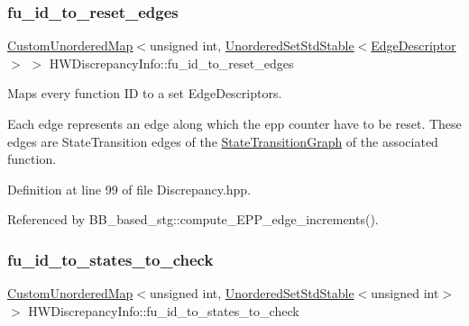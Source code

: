 \mbox{\label{structHWDiscrepancyInfo_a0e2c562ae790d5f14cf7ce2a9a8bfd88}} 
\subsubsection{\texorpdfstring{fu\+\_\+id\+\_\+to\+\_\+reset\+\_\+edges}{fu\_id\_to\_reset\_edges}}
{\footnotesize\ttfamily \hyperlink{custom__map_8hpp_ad1ed68f2ff093683ab1a33522b144adc}{Custom\+Unordered\+Map}$<$unsigned int, \hyperlink{custom__set_8hpp_a1f63d303cef2790dc0a0ff7feae38f83}{Unordered\+Set\+Std\+Stable}$<$\hyperlink{graph_8hpp_a9eb9afea34e09f484b21f2efd263dd48}{Edge\+Descriptor}$>$ $>$ H\+W\+Discrepancy\+Info\+::fu\+\_\+id\+\_\+to\+\_\+reset\+\_\+edges}



Maps every function ID to a set Edge\+Descriptors. 

Each edge represents an edge along which the epp counter have to be reset. These edges are State\+Transition edges of the \hyperlink{structStateTransitionGraph}{State\+Transition\+Graph} of the associated function. 

Definition at line 99 of file Discrepancy.\+hpp.



Referenced by B\+B\+\_\+based\+\_\+stg\+::compute\+\_\+\+E\+P\+P\+\_\+edge\+\_\+increments().

\mbox{\label{structHWDiscrepancyInfo_a094b1af848ebfd6303824a42c9a32667}} 
\subsubsection{\texorpdfstring{fu\+\_\+id\+\_\+to\+\_\+states\+\_\+to\+\_\+check}{fu\_id\_to\_states\_to\_check}}
{\footnotesize\ttfamily \hyperlink{custom__map_8hpp_ad1ed68f2ff093683ab1a33522b144adc}{Custom\+Unordered\+Map}$<$unsigned int, \hyperlink{custom__set_8hpp_a1f63d303cef2790dc0a0ff7feae38f83}{Unordered\+Set\+Std\+Stable}$<$unsigned int$>$ $>$ H\+W\+Discrepancy\+Info\+::fu\+\_\+id\+\_\+to\+\_\+states\+\_\+to\+\_\+check}



